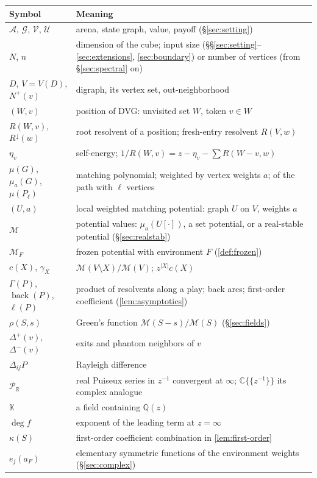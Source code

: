 \documentclass[11pt]{amsart}
\theoremstyle{plain}
\theoremstyle{definition}
\theoremstyle{remark}
\numberwithin{equation}{section}
\newcommand{\QQ}{\mathbb{Q}}
\newcommand{\RR}{\mathbb{R}}
\newcommand{\CC}{\mathbb{C}}
\newcommand{\Qz}{\QQ(z)}
\newcommand{\Puis}{\mathcal{P}_{\RR}}
\newcommand{\val}{\mathcal{V}}            %
\newcommand{\pay}{\mathcal{U}}            %
\newcommand{\SG}{\mathcal{G}}             %
\newcommand{\arena}{\mathcal{A}}          %
\newcommand{\Mpot}{\mathcal{M}}           %
\newcommand{\back}{\operatorname{back}}
\newcommand{\Rdown}{R^{\downarrow}}
\newcommand{\nplus}{N^{+}}
\begin{document}
\begin{center}\small
\begin{longtable}{@{}L{0.25}L{0.71}@{}}
\toprule
Symbol & Meaning\\ \midrule\endhead
$\arena$, $\SG$, $\val$, $\pay$ & arena, state graph, value, payoff (\S\ref{sec:setting})\\
$N$, $n$ & dimension of the cube; input size (\S\S\ref{sec:setting}--\ref{sec:extensions}, \ref{sec:boundary}) or number of vertices (from \S\ref{sec:spectral} on)\\
$D$, $V=V(D)$, $\nplus(v)$ & digraph, its vertex set, out-neighborhood\\
$(W,v)$ & position of DVG: unvisited set $W$, token $v\in W$\\
$R(W,v)$, $\Rdown(w)$ & root resolvent of a position; fresh-entry resolvent $R(V,w)$\\
$\eta_v$ & self-energy; $1/R(W,v)=z-\eta_v-\sum R(W-v,w)$\\
$\mu(G)$, $\mu_a(G)$, $\mu(P_\ell)$ & matching polynomial; weighted by vertex weights $a$; of the path with $\ell$ vertices\\
$(U,a)$ & local weighted matching potential: graph $U$ on $V$, weights $a$\\
$\Mpot$ & potential values: $\mu_a(U[\cdot])$, a set potential, or a real-stable potential (\S\ref{sec:realstab})\\
$\Mpot_F$ & frozen potential with environment $F$ (\cref{def:frozen})\\
$c(X)$, $\gamma_X$ & $\Mpot(V\setminus X)/\Mpot(V)$; $z^{|X|}c(X)$\\
$\Gamma(P)$, $\back(P)$, $\ell(P)$ & product of resolvents along a play; back arcs; first-order coefficient (\cref{lem:asymptotics})\\
$\rho(S,s)$ & Green's function $\Mpot(S-s)/\Mpot(S)$ (\S\ref{sec:fields})\\
$\Delta^{+}(v)$, $\Delta^{-}(v)$ & exits and phantom neighbors of $v$\\
$\Delta_{ij}P$ & Rayleigh difference\\
$\Puis$ & real Puiseux series in $z^{-1}$ convergent at $\infty$; $\CC\{\!\{z^{-1}\}\!\}$ its complex analogue\\
$\mathbb K$ & a field containing $\Qz$\\
$\deg f$ & exponent of the leading term at $z=\infty$\\
$\kappa(S)$ & first-order coefficient combination in \cref{lem:first-order}\\
$e_j(a_F)$ & elementary symmetric functions of the environment weights (\S\ref{sec:complex})\\

\end{longtable}
\end{center}
\end{document}
